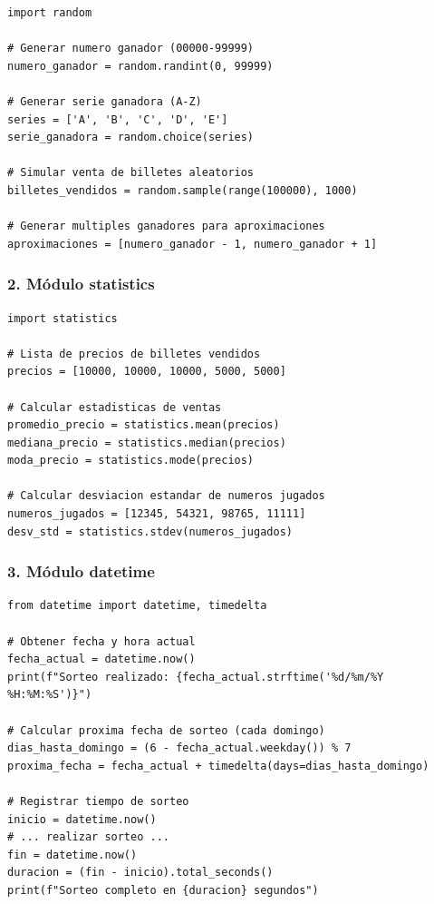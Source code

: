 \documentclass[12pt,a4paper]{article}
\begin{document}
\begin{lstlisting}[caption=Uso de random para sorteos]
import random

# Generar numero ganador (00000-99999)
numero_ganador = random.randint(0, 99999)

# Generar serie ganadora (A-Z)
series = ['A', 'B', 'C', 'D', 'E']
serie_ganadora = random.choice(series)

# Simular venta de billetes aleatorios
billetes_vendidos = random.sample(range(100000), 1000)

# Generar multiples ganadores para aproximaciones
aproximaciones = [numero_ganador - 1, numero_ganador + 1]
\end{lstlisting}

\subsubsection{2. Módulo statistics}

\begin{lstlisting}[caption=Uso de statistics para analisis]
import statistics

# Lista de precios de billetes vendidos
precios = [10000, 10000, 10000, 5000, 5000]

# Calcular estadisticas de ventas
promedio_precio = statistics.mean(precios)
mediana_precio = statistics.median(precios)
moda_precio = statistics.mode(precios)

# Calcular desviacion estandar de numeros jugados
numeros_jugados = [12345, 54321, 98765, 11111]
desv_std = statistics.stdev(numeros_jugados)
\end{lstlisting}

\subsubsection{3. Módulo datetime}

\begin{lstlisting}[caption=Uso de datetime para fechas]
from datetime import datetime, timedelta

# Obtener fecha y hora actual
fecha_actual = datetime.now()
print(f"Sorteo realizado: {fecha_actual.strftime('%d/%m/%Y %H:%M:%S')}")

# Calcular proxima fecha de sorteo (cada domingo)
dias_hasta_domingo = (6 - fecha_actual.weekday()) % 7
proxima_fecha = fecha_actual + timedelta(days=dias_hasta_domingo)

# Registrar tiempo de sorteo
inicio = datetime.now()
# ... realizar sorteo ...
fin = datetime.now()
duracion = (fin - inicio).total_seconds()
print(f"Sorteo completo en {duracion} segundos")
\end{lstlisting}
\end{document}

